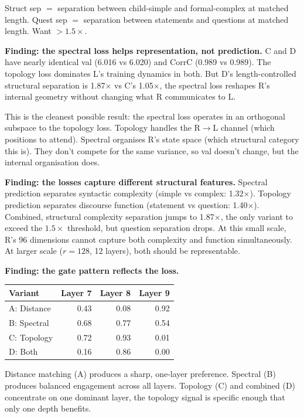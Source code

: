 \documentclass[11pt, a4paper]{article}
\theoremstyle{plain}
\theoremstyle{definition}
\theoremstyle{remark}
\begin{document}
\noindent Struct sep $=$ separation between child-simple and formal-complex at matched length.
Quest sep $=$ separation between statements and questions at matched length.
Want $> 1.5\times$.

\textbf{Finding: the spectral loss helps representation, not prediction.}
C and D have nearly identical val (6.016 vs 6.020) and CorrC (0.989 vs 0.989).
The topology loss dominates L's training dynamics in both.
But D's length-controlled structural separation is 1.87$\times$ vs C's 1.05$\times$, the spectral loss reshapes R's internal geometry without changing what R communicates to L.

This is the cleanest possible result: the spectral loss operates in an orthogonal subspace to the topology loss.
Topology handles the R$\to$L channel (which positions to attend).
Spectral organises R's state space (which structural category this is).
They don't compete for the same variance, so val doesn't change, but the internal organisation does.

\textbf{Finding: the losses capture different structural features.}
Spectral prediction separates syntactic complexity (simple vs complex: 1.32$\times$).
Topology prediction separates discourse function (statement vs question: 1.40$\times$).
Combined, structural complexity separation jumps to 1.87$\times$, the only variant to exceed the $1.5\times$ threshold, but question separation drops.
At this small scale, R's 96 dimensions cannot capture both complexity and function simultaneously.
At larger scale ($r = 128$, 12 layers), both should be representable.

\textbf{Finding: the gate pattern reflects the loss.}
\begin{center}\small
\begin{tabular}{lrrr}
\toprule
\textbf{Variant} & \textbf{Layer 7} & \textbf{Layer 8} & \textbf{Layer 9} \\
\midrule
A: Distance & 0.43 & 0.08 & 0.92 \\
B: Spectral & 0.68 & 0.77 & 0.54 \\
C: Topology & 0.72 & 0.93 & 0.01 \\
D: Both & 0.16 & 0.86 & 0.00 \\
\bottomrule
\end{tabular}
\end{center}
Distance matching (A) produces a sharp, one-layer preference.
Spectral (B) produces balanced engagement across all layers.
Topology (C) and combined (D) concentrate on one dominant layer, the topology signal is specific enough that only one depth benefits.
\end{document}
